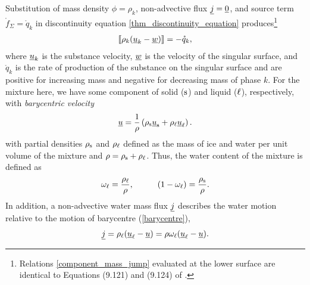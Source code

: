 Substitution of mass density $\phi = \rho_k$, non-advective flux $\underline{j} = \underline{0}$, and source term $\mathring{f}_{\Sigma} = \mathring{q}_k$ in discontinuity equation \ref{thm_discontinuity_equation} produces\footnote{Relations \ref{component_mass_jump} evaluated at the lower surface are identical to Equations (9.121) and (9.124) of \cite{greve_2009}.}
\begin{align}
  \label{component_mass_jump}
  \left\llbracket { \rho_k (\underline{u}_k - \underline{w}) } \right\rrbracket = - \mathring{q}_{k},
\end{align}
where $\underline{u}_k$ is the substance velocity, $\underline{w}$ is the velocity of the singular surface, and $\mathring{q}_k$ is the rate of production of the substance on the singular surface and are positive for increasing mass and negative for decreasing mass of phase $k$.
For the mixture here, we have some component of solid ($\mathrm{s}$) and liquid ($\mathrm{\ell}$), respectively, with \emph{barycentric velocity} \citep{moebius_1827}
\begin{align}
  \label{barycentre}
  \underline{u} = \frac{1}{\rho} \left( \rho_{\mathrm{s}} \underline{u}_{\mathrm{s}} + \rho_{\mathrm{\ell}} \underline{u}_{\mathrm{\ell}} \right).
\end{align}
with partial densities $\rho_{\mathrm{s}}$ and $\rho_{\mathrm{\ell}}$ defined as the mass of ice and water per unit volume of the mixture and $\rho = \rho_{\mathrm{s}} + \rho_{\mathrm{\ell}}$.
Thus, the water content of the mixture is defined as
\begin{align}
  \label{mass_fraction_water_content}
  \omega_{\liquid} = \frac{\rho_{\liquid}}{\rho}, \hspace{10mm} (1-\omega_{\liquid}) = \frac{\rho_{\solid}}{\rho}.
\end{align}
In addition, a non-advective water mass flux $\underline{j}$ describes the water motion relative to the motion of barycentre (\ref{barycentre}),
\begin{align}
  \label{diffusive_latent_flux}
  \underline{j} = \rho_{\mathrm{\ell}} (\underline{u}_{\mathrm{\ell}} - \underline{u}) = \rho \omega_{\mathrm{\ell}} (\underline{u}_{\mathrm{\ell}} - \underline{u}).
\end{align}

